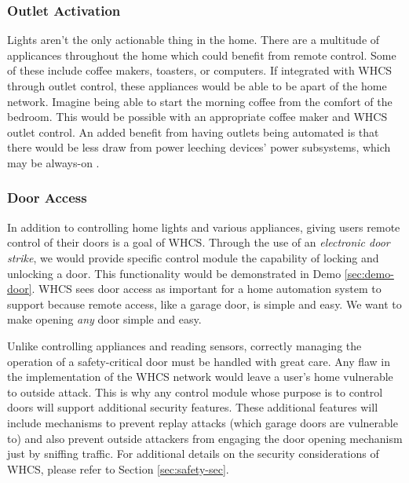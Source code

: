 \subsubsection{Outlet Activation}
Lights aren't the only actionable thing in the home. There are a multitude of
applicances throughout the home which could benefit from remote control. Some
of these include coffee makers, toasters, or computers. If integrated with WHCS through outlet control, these appliances
would be able to be apart of the home network. Imagine being able to start the
morning coffee from the comfort of the bedroom. This would be possible with an
appropriate coffee maker and WHCS outlet control. An added benefit from having
outlets being automated is that there would be less draw from power leeching
devices' power subsystems, which may be always-on .

\subsubsection{Door Access}
In addition to controlling home lights and various appliances, giving users
remote control of their doors is  a goal of WHCS. Through the use of an
\emph{electronic door strike}, we would provide specific control module the
capability of locking and unlocking a door. This functionality would be
demonstrated in Demo \ref{sec:demo-door}. WHCS sees door access as important
for a home automation system to support because remote access, like a garage
door, is simple and easy. We want to make opening \emph{any} door simple and
easy.

Unlike controlling appliances and reading sensors, correctly managing the
operation of a safety-critical door must be handled with great care. Any flaw
in the implementation of the WHCS network would leave a user's home vulnerable
to outside attack. This is why any control module whose purpose is to control
doors will support additional security features. These additional features will
include mechanisms to prevent replay attacks (which garage doors are vulnerable
to) and also prevent outside attackers from engaging the door opening mechanism
just by sniffing traffic. For additional details on the security considerations
of WHCS, please refer to Section \ref{sec:safety-sec}.

